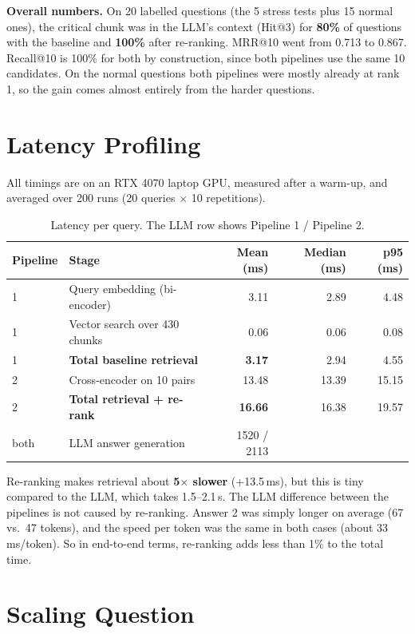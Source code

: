 \documentclass[11pt]{article}
\begin{document}
\textbf{Overall numbers.} On 20 labelled questions (the 5 stress tests plus 15 normal ones), the critical chunk was in
the LLM's context (Hit@3) for \textbf{80\%} of questions with the baseline and \textbf{100\%} after re-ranking. MRR@10
went from 0.713 to 0.867. Recall@10 is 100\% for both by construction, since both pipelines use the same 10 candidates.
On the normal questions both pipelines were mostly already at rank 1, so the gain comes almost entirely from the harder
questions.

\section{Latency Profiling}

All timings are on an RTX 4070 laptop GPU, measured after a warm-up, and averaged over 200 runs
(20 queries $\times$ 10 repetitions).

\begin{table}[h]
\centering\small
\begin{tabular}{@{}llrrr@{}}
\toprule
Pipeline & Stage & Mean (ms) & Median (ms) & p95 (ms) \\
\midrule
1 & Query embedding (bi-encoder) & 3.11 & 2.89 & 4.48 \\
1 & Vector search over 430 chunks & 0.06 & 0.06 & 0.08 \\
1 & \textbf{Total baseline retrieval} & \textbf{3.17} & 2.94 & 4.55 \\
\midrule
2 & Cross-encoder on 10 pairs & 13.48 & 13.39 & 15.15 \\
2 & \textbf{Total retrieval + re-rank} & \textbf{16.66} & 16.38 & 19.57 \\
\midrule
both & LLM answer generation & 1520 / 2113 & & \\
\bottomrule
\end{tabular}
\caption{Latency per query. The LLM row shows Pipeline 1 / Pipeline 2.}
\end{table}

\vspace{-0.3cm}
Re-ranking makes retrieval about \textbf{5$\times$ slower} (+13.5\,ms), but this is tiny compared to the LLM, which takes
1.5--2.1\,s. The LLM difference between the pipelines is not caused by re-ranking. Answer 2 was simply longer on average
(67 vs.\ 47 tokens), and the speed per token was the same in both cases (about 33\,ms/token). So in end-to-end terms,
re-ranking adds less than 1\% to the total time.

\section{Scaling Question}
\end{document}
